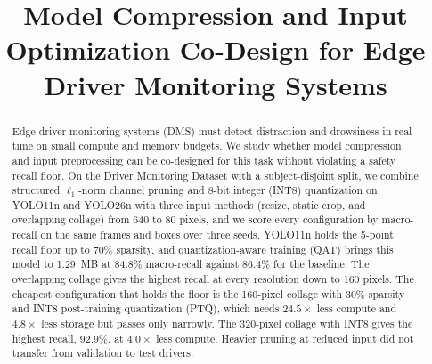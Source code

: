 \documentclass[conference]{IEEEtran}
\begin{document}
\renewcommand{\topfraction}{0.9}
\renewcommand{\bottomfraction}{0.8}
\renewcommand{\textfraction}{0.07}
\renewcommand{\floatpagefraction}{0.7}
\setcounter{topnumber}{4}
\setcounter{bottomnumber}{4}
\setcounter{totalnumber}{6}

\title{Model Compression and Input Optimization Co-Design for Edge Driver Monitoring Systems}

\author{
  \and
  \and
}

\maketitle

\begin{abstract}
Edge driver monitoring systems (DMS) must detect distraction and drowsiness in real time on small compute and memory budgets. We study whether model compression and input preprocessing can be co-designed for this task without violating a safety recall floor. On the Driver Monitoring Dataset with a subject-disjoint split, we combine structured $\ell_1$-norm channel pruning and 8-bit integer (INT8) quantization on YOLO11n and YOLO26n with three input methods (resize, static crop, and overlapping collage) from 640 to 80 pixels, and we score every configuration by macro-recall on the same frames and boxes over three seeds. YOLO11n holds the 5-point recall floor up to 70\% sparsity, and quantization-aware training (QAT) brings this model to 1.29~MB at 84.8\% macro-recall against 86.4\% for the baseline. The overlapping collage gives the highest recall at every resolution down to 160 pixels. The cheapest configuration that holds the floor is the 160-pixel collage with 30\% sparsity and INT8 post-training quantization (PTQ), which needs $24.5\times$ less compute and $4.8\times$ less storage but passes only narrowly. The 320-pixel collage with INT8 gives the highest recall, 92.9\%, at $4.0\times$ less compute. Heavier pruning at reduced input did not transfer from validation to test drivers.
\end{abstract}
\end{document}
